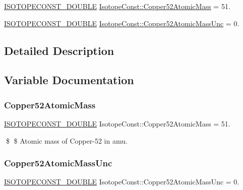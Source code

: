 \begin{DoxyCompactItemize}
\item 
\mbox{\hyperlink{group___isotope_const-_macros_ga8f45a7272ce02c0b4c65c44636ed719a}{I\+S\+O\+T\+O\+P\+E\+C\+O\+N\+S\+T\+\_\+\+D\+O\+U\+B\+LE}} \mbox{\hyperlink{group___isotope_const-_copper-_cu52_gac67360c8dd74ba7f38a971d3d9682cf2}{Isotope\+Const\+::\+Copper52\+Atomic\+Mass}} = 51.
\item 
\mbox{\hyperlink{group___isotope_const-_macros_ga8f45a7272ce02c0b4c65c44636ed719a}{I\+S\+O\+T\+O\+P\+E\+C\+O\+N\+S\+T\+\_\+\+D\+O\+U\+B\+LE}} \mbox{\hyperlink{group___isotope_const-_copper-_cu52_gae665b94a7172434305dc0d23855c34fa}{Isotope\+Const\+::\+Copper52\+Atomic\+Mass\+Unc}} = 0.
\end{DoxyCompactItemize}


\subsection{Detailed Description}


\subsection{Variable Documentation}
\mbox{\label{group___isotope_const-_copper-_cu52_gac67360c8dd74ba7f38a971d3d9682cf2}} 
\subsubsection{\texorpdfstring{Copper52\+Atomic\+Mass}{Copper52AtomicMass}}
{\footnotesize\ttfamily \mbox{\hyperlink{group___isotope_const-_macros_ga8f45a7272ce02c0b4c65c44636ed719a}{I\+S\+O\+T\+O\+P\+E\+C\+O\+N\+S\+T\+\_\+\+D\+O\+U\+B\+LE}} Isotope\+Const\+::\+Copper52\+Atomic\+Mass = 51.}

\$ \$ Atomic mass of Copper-\/52 in amu. \mbox{\label{group___isotope_const-_copper-_cu52_gae665b94a7172434305dc0d23855c34fa}} 
\subsubsection{\texorpdfstring{Copper52\+Atomic\+Mass\+Unc}{Copper52AtomicMassUnc}}
{\footnotesize\ttfamily \mbox{\hyperlink{group___isotope_const-_macros_ga8f45a7272ce02c0b4c65c44636ed719a}{I\+S\+O\+T\+O\+P\+E\+C\+O\+N\+S\+T\+\_\+\+D\+O\+U\+B\+LE}} Isotope\+Const\+::\+Copper52\+Atomic\+Mass\+Unc = 0.}

